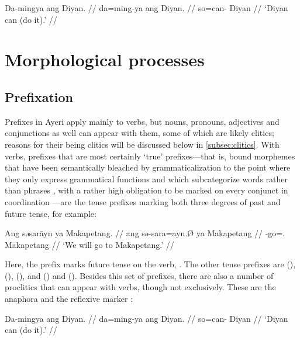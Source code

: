 \ex\begingl
	\gla Da-mingya ang Diyan. //
	\glb da=ming-ya ang Diyan. //
	\glc so=can-\TsgM{} \Aarg{} Diyan //
	\glft `Diyan can (do it).' //
\endgl\xe

\section{Morphological processes}

\subsection{Prefixation}

Prefixes in Ayeri apply mainly to verbs, but nouns, pronouns, adjectives and
conjunctions as well can appear with them, some of which are likely clitics;
reasons for their being clitics will be discussed below in
\autoref{subsec:clitics}. With verbs, prefixes that are most certainly `true'
prefixes---that is, bound morphemes that have been semantically bleached by
grammaticalization to the point where they only express grammatical functions
\citep[157\psqq]{lehmann2015} and which subcategorize words rather than phrases
\citep[117]{klavans1985}, with a rather high obligation to be marked on every
conjunct in coordination \citep[139]{spencerluis2012}---are the tense prefixes
marking both three degrees of past and future tense, for example:

\ex\begingl
	\gla Ang səsarāyn ya Makapetang. //
	\glb ang sə-sara=ayn.Ø ya Makapetang //
	\glc \AgtT{} \Fut{}-go=\Fpl{}.\Top{} \Loc{} Makapetang //
	\glft `We will go to Makapetang.' //
\endgl\xe

Here, the prefix  marks future tense on the verb, 
. The other tense prefixes are  
(\NPst{}),  (\Pst{}),  (\RPst{}), and 
 (\NFut{}) and  (\RFut{}). Besides this set of 
prefixes, there are also a number of proclitics that can appear with verbs, 
though not exclusively. These are the anaphora  
and the reflexive marker 
:
 
\ex\begingl
	\gla Da-mingya ang Diyan. //
	\glb da=ming-ya ang Diyan. //
	\glc so=can-\TsgM{} \Aarg{} Diyan //
	\glft `Diyan can (do it).' //
\endgl
% 
\xe

